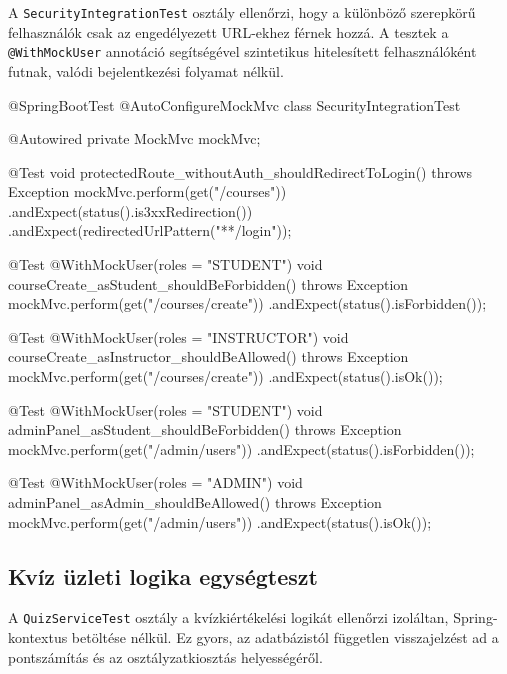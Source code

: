 A \texttt{SecurityIntegrationTest} osztály ellenőrzi, hogy a különböző szerepkörű felhasználók csak az engedélyezett URL-ekhez férnek hozzá. A tesztek a \texttt{@WithMockUser} annotáció segítségével szintetikus hitelesített felhasználóként futnak, valódi bejelentkezési folyamat nélkül.

\begin{java}[caption={Szerepkör-alapú hozzáférés-vezérlés integrációs tesztje},label=java:securitytest]
@SpringBootTest
@AutoConfigureMockMvc
class SecurityIntegrationTest {

    @Autowired
    private MockMvc mockMvc;

    @Test
    void protectedRoute_withoutAuth_shouldRedirectToLogin()
            throws Exception {
        mockMvc.perform(get("/courses"))
               .andExpect(status().is3xxRedirection())
               .andExpect(redirectedUrlPattern("**/login"));
    }

    @Test
    @WithMockUser(roles = "STUDENT")
    void courseCreate_asStudent_shouldBeForbidden() throws Exception {
        mockMvc.perform(get("/courses/create"))
               .andExpect(status().isForbidden());
    }

    @Test
    @WithMockUser(roles = "INSTRUCTOR")
    void courseCreate_asInstructor_shouldBeAllowed() throws Exception {
        mockMvc.perform(get("/courses/create"))
               .andExpect(status().isOk());
    }

    @Test
    @WithMockUser(roles = "STUDENT")
    void adminPanel_asStudent_shouldBeForbidden() throws Exception {
        mockMvc.perform(get("/admin/users"))
               .andExpect(status().isForbidden());
    }

    @Test
    @WithMockUser(roles = "ADMIN")
    void adminPanel_asAdmin_shouldBeAllowed() throws Exception {
        mockMvc.perform(get("/admin/users"))
               .andExpect(status().isOk());
    }
}
\end{java}

\subsection{Kvíz üzleti logika egységteszt}

A \texttt{QuizServiceTest} osztály a kvízkiértékelési logikát ellenőrzi izoláltan, Spring-kontextus betöltése nélkül. Ez gyors, az adatbázistól független visszajelzést ad a pontszámítás és az osztályzatkiosztás helyességéről.

